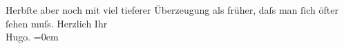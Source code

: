 \begin{ledgroupsized}[t]{13cm}
                    Herbſte aber noch mit viel tieferer Überzeugung als früher, daſs man ſich öfter
                    ſehen muſs.\pend
           \pstart
           Herzlich Ihr{\\[\baselineskip]}\spacefill\mbox{Hugo.}\pend
           \leftskip=0em{}          \endnumbering{}\end{ledgroupsized}  \newcommand{\dateiname}{L00849}\newcommand{\titel}{Hugo von Hofmannsthal an Arthur Schnitzler, 2. 10. [1898]}\newcommand{\editorInnen}{Martin Anton Müller und Gerd-Hermann Susen}
            \footnotesize
\begin{ledgroupsized}[t]{11.5cm}
\end{ledgroupsized}
         
      